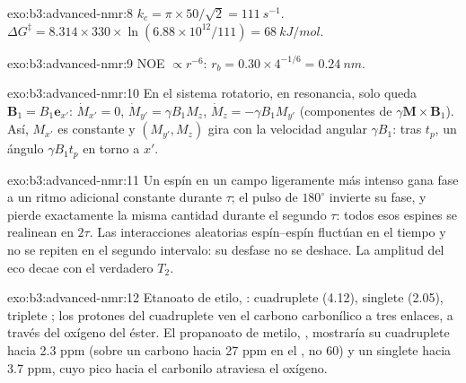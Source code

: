 \begin{solution}{exo:b3:advanced-nmr:8}
$k_c = \pi \times 50/\sqrt2 = \qty{111}{s^{-1}}$. $\Delta G^\ddagger = 8.314 \times 330 \times
\ln(6.88\times10^{12}/111) = \qty{68}{kJ/mol}$.
\end{solution}

\begin{solution}{exo:b3:advanced-nmr:9}
NOE $\propto r^{-6}$: $r_b = 0.30 \times 4^{-1/6} = \qty{0.24}{nm}$.
\end{solution}

\begin{solution}{exo:b3:advanced-nmr:10}
En el sistema rotatorio, en resonancia, solo queda $\mathbf B_1 = B_1\mathbf e_{x'}$:
$\dot M_{x'} = 0$, $\dot M_{y'} = \gamma B_1M_z$, $\dot M_z = -\gamma B_1M_{y'}$ (componentes de
$\gamma\mathbf M\times\mathbf B_1$). Así, $M_{x'}$ es constante y $(M_{y'}, M_z)$ gira con la velocidad
angular $\gamma B_1$: tras $t_p$, un ángulo $\gamma B_1t_p$ en torno a $x'$.
\end{solution}

\begin{solution}{exo:b3:advanced-nmr:11}
Un espín en un campo ligeramente más intenso gana fase a un ritmo adicional constante durante
$\tau$; el pulso de $180^\circ$ invierte su fase, y pierde exactamente la misma cantidad
durante el segundo $\tau$: todos esos espines se realinean en $2\tau$. Las interacciones
aleatorias espín--espín fluctúan en el tiempo y no se repiten en el segundo intervalo: su
desfase no se deshace. La amplitud del eco decae con el verdadero $T_2$.
\end{solution}

\begin{solution}{exo:b3:advanced-nmr:12}
Etanoato de etilo, : cuadruplete  (4.12), singlete  (2.05),
triplete ; los protones del cuadruplete ven el carbono carbonílico a tres enlaces,
a través del oxígeno del éster. El propanoato de metilo, , mostraría su
cuadruplete hacia 2.3 ppm (sobre un carbono hacia 27 ppm en el , no 60) y un singlete
 hacia 3.7 ppm, cuyo pico  hacia el carbonilo atraviesa el oxígeno.
\end{solution}

